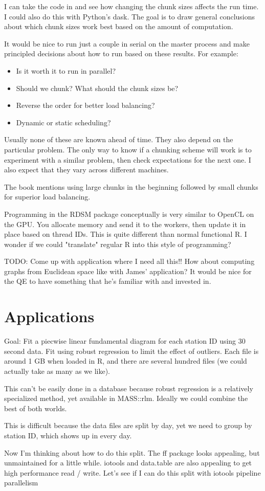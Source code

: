 \documentclass[12pt]{article}
\begin{document}
I can take the code in \cite{matloff2015parallel} and see how changing the
chunk sizes affects the run time. I could also do this with Python's dask.
The goal is to draw general conclusions about which chunk sizes work best
based on the amount of computation.

It would be nice to run just a couple in serial on the master process and
make principled decisions about how to run based on these results. For
example:
\begin{itemize}
    \item Is it worth it to run in parallel?
    \item Should we chunk? What should the chunk sizes be?
    \item Reverse the order for better load balancing?
    \item Dynamic or static scheduling?
\end{itemize}

Usually none of these are known ahead of time.  They also depend on the
particular problem.  The only way to know if a chunking scheme will work is
to experiment with a similar problem, then check expectations for the next
one. I also expect that they vary across different machines.

The book mentions using large chunks in the beginning followed by small
chunks for superior load balancing.

Programming in the RDSM package conceptually is very similar to OpenCL on
the GPU. You allocate memory and send it to the workers, then update it in
place based on thread IDs. This is quite different than normal functional
R. I wonder if we could "translate" regular R into this style of
programming?

TODO: Come up with application where I need all this!! How about computing
graphs from Euclidean space like with James' application? It would be nice
for the QE to have something that he's familiar with and invested in.

\section{Applications}

Goal: Fit a piecwise linear fundamental diagram for each station ID using 30 second
data. Fit using robust regression to limit the effect of outliers.
Each file is around 1 GB when loaded in R, and there are several hundred
files (we could actually take as many as we like).

This can't be easily done in a database because robust regression is
a relatively specialized method, yet available in MASS::rlm.
Ideally we could combine the best of both worlds.

This is difficult because the data files are split by day, yet we
need to group by station ID, which shows up in every day.

Now I'm thinking about how to do this split. The ff package looks
appealing, but unmaintained for a little while. iotools and data.table
are also appealing to get high performance read / write. Let's see if I
can do this split with iotools pipeline parallelism



 
\end{document}
